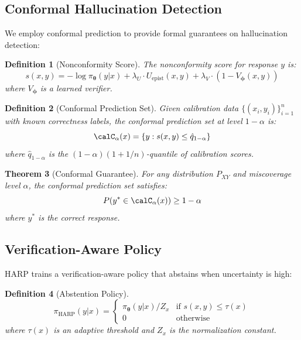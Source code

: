 \documentclass[11pt,a4paper]{article}
\newtheorem{theorem}{Theorem}[section]
\newtheorem{definition}[theorem]{Definition}
\newcommand{\btheta}{\bm{\theta}}
\newcommand{\bphi}{\bm{\phi}}
\begin{document}
\subsection{Conformal Hallucination Detection}

We employ conformal prediction to provide formal guarantees on hallucination detection:

\begin{definition}[Nonconformity Score]
The nonconformity score for response $y$ is:
\begin{equation}
    s(x, y) = -\log \pi_\btheta(y|x) + \lambda_U \cdot U_{\text{epist}}(x, y) + \lambda_V \cdot (1 - V_\bphi(x, y))
\end{equation}
where $V_\bphi$ is a learned verifier.
\end{definition}

\begin{definition}[Conformal Prediction Set]
Given calibration data $\{(x_i, y_i)\}_{i=1}^n$ with known correctness labels, the conformal prediction set at level $1-\alpha$ is:
\begin{equation}
    \calC_\alpha(x) = \{y : s(x, y) \leq \hat{q}_{1-\alpha}\}
\end{equation}
where $\hat{q}_{1-\alpha}$ is the $(1-\alpha)(1+1/n)$-quantile of calibration scores.
\end{definition}

\begin{theorem}[Conformal Guarantee]
\label{thm:harp_conformal}
For any distribution $P_{XY}$ and miscoverage level $\alpha$, the conformal prediction set satisfies:
\begin{equation}
    P(y^* \in \calC_\alpha(x)) \geq 1 - \alpha
\end{equation}
where $y^*$ is the correct response.
\end{theorem}

\subsection{Verification-Aware Policy}

HARP trains a verification-aware policy that abstains when uncertainty is high:

\begin{definition}[Abstention Policy]
\begin{equation}
    \pi_{\text{HARP}}(y|x) = \begin{cases}
        \pi_\btheta(y|x) / Z_x & \text{if } s(x,y) \leq \tau(x) \\
        0 & \text{otherwise}
    \end{cases}
\end{equation}
where $\tau(x)$ is an adaptive threshold and $Z_x$ is the normalization constant.
\end{definition}
\end{document}
